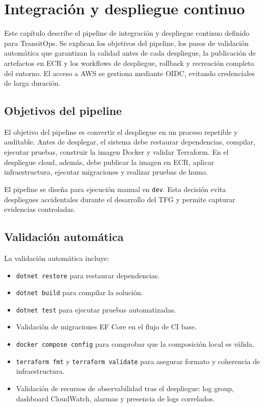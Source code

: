 \chapter{Integración y despliegue continuo}
\label{chap:cicd}

Este capítulo describe el pipeline de integración y despliegue continuo definido para TransitOps. Se explican los objetivos del pipeline, los pasos de validación automática que garantizan la calidad antes de cada despliegue, la publicación de artefactos en ECR y los workflows de despliegue, rollback y recreación completa del entorno. El acceso a AWS se gestiona mediante OIDC, evitando credenciales de larga duración.

\section{Objetivos del pipeline}
\label{sec:objetivos-pipeline}

El objetivo del pipeline es convertir el despliegue en un proceso repetible y auditable. Antes de desplegar, el sistema debe restaurar dependencias, compilar, ejecutar pruebas, construir la imagen Docker y validar Terraform. En el despliegue cloud, además, debe publicar la imagen en ECR, aplicar infraestructura, ejecutar migraciones y realizar pruebas de humo.

El pipeline se diseña para ejecución manual en \texttt{dev}. Esta decisión evita despliegues accidentales durante el desarrollo del TFG y permite capturar evidencias controladas.

\section{Validación automática}
\label{sec:validacion-automatica}

La validación automática incluye:

\begin{itemize}
  \item \texttt{dotnet restore} para restaurar dependencias.
  \item \texttt{dotnet build} para compilar la solución.
  \item \texttt{dotnet test} para ejecutar pruebas automatizadas.
  \item Validación de migraciones EF Core en el flujo de CI base.
  \item \texttt{docker compose config} para comprobar que la composición local es válida.
  \item \texttt{terraform fmt} y \texttt{terraform validate} para asegurar formato y coherencia de infraestructura.
  \item Validación de recursos de observabilidad tras el despliegue: log group, dashboard CloudWatch, alarmas y presencia de logs correlados.
\end{itemize}

